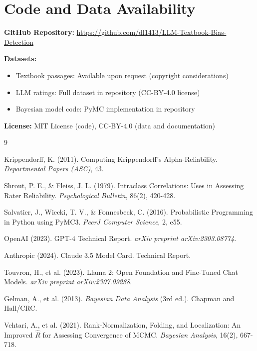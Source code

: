 \documentclass[11pt,a4paper]{article}
\begin{document}
\section*{Code and Data Availability}

\textbf{GitHub Repository:} \url{https://github.com/dl1413/LLM-Textbook-Bias-Detection}

\textbf{Datasets:}
\begin{itemize}
    \item Textbook passages: Available upon request (copyright considerations)
    \item LLM ratings: Full dataset in repository (CC-BY-4.0 license)
    \item Bayesian model code: PyMC implementation in repository
\end{itemize}

\textbf{License:} MIT License (code), CC-BY-4.0 (data and documentation)


\begin{thebibliography}{9}

Krippendorff, K. (2011).
\newblock Computing Krippendorff's Alpha-Reliability.
\newblock \textit{Departmental Papers (ASC)}, 43.

Shrout, P. E., \& Fleiss, J. L. (1979).
\newblock Intraclass Correlations: Uses in Assessing Rater Reliability.
\newblock \textit{Psychological Bulletin}, 86(2), 420-428.

Salvatier, J., Wiecki, T. V., \& Fonnesbeck, C. (2016).
\newblock Probabilistic Programming in Python using PyMC3.
\newblock \textit{PeerJ Computer Science}, 2, e55.

OpenAI (2023).
\newblock GPT-4 Technical Report.
\newblock \textit{arXiv preprint arXiv:2303.08774}.

Anthropic (2024).
\newblock Claude 3.5 Model Card.
\newblock Technical Report.

Touvron, H., et al. (2023).
\newblock Llama 2: Open Foundation and Fine-Tuned Chat Models.
\newblock \textit{arXiv preprint arXiv:2307.09288}.

Gelman, A., et al. (2013).
\newblock \textit{Bayesian Data Analysis} (3rd ed.).
\newblock Chapman and Hall/CRC.

Vehtari, A., et al. (2021).
\newblock Rank-Normalization, Folding, and Localization: An Improved $\hat{R}$ for Assessing Convergence of MCMC.
\newblock \textit{Bayesian Analysis}, 16(2), 667-718.

\end{thebibliography}
\end{document}
